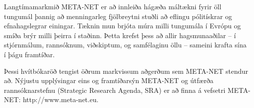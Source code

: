 \begin{multicols}{2}
Langtímamarkmið META-NET er að innleiða hágæða máltækni fyrir öll tungumál þannig að menningarleg fjölbreytni stuðli að eflingu pólitískrar og efnahagslegrar einingar. Tæknin mun brjóta múra milli tungumála í Evrópu og smíða brýr milli þeirra í staðinn. Þetta krefst þess að allir hagsmunaaðilar -- í stjórnmálum, rannsóknum, viðskiptum, og samfélaginu öllu -- sameini krafta sína í þágu framtíðar. 

Þessi hvítbókaröð tengist öðrum markvissum aðgerðum sem META-NET stendur að. Nýjustu upplýsingar eins og framtíðarsýn \cite{Meta1} META-NET og útfærða rannsóknarstefnu (Strategic Research Agenda, SRA) er að finna á vefsetri META-NET: http://www.meta-net.eu.
\end{multicols}

\clearpage



